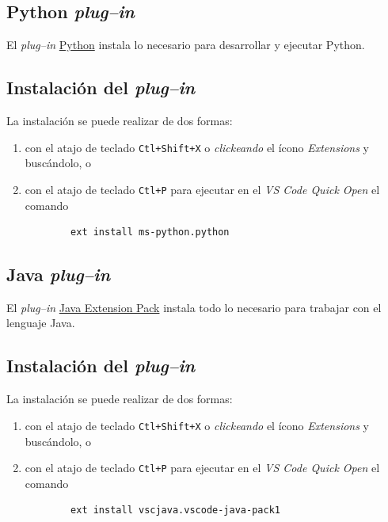 \ifx\python\undefined
\subsection{Python \emph{plug--in}}
\label{pluginPython}

El \emph{plug--in} \href{https://marketplace.visualstudio.com/items?itemName=ms-python.python}{Python} instala lo necesario para desarrollar y ejecutar Python.

\subsection*{Instalación del \emph{plug--in}}
\label{instalacionPython}

La instalación se puede realizar de dos formas:
\begin{enumerate}
	\item con el atajo de teclado \verb|Ctl+Shift+X| o \emph{clickeando} el ícono \emph{Extensions} y buscándolo, o
    \item con el atajo de teclado \verb|Ctl+P| para ejecutar en el \emph{VS Code Quick Open} el comando
    \begin{verbatim}
		ext install ms-python.python
	\end{verbatim}
\end{enumerate}
\fi

\subsection{Java \emph{plug--in}}
\label{pluginJava}

El \emph{plug--in} \href{https://marketplace.visualstudio.com/items?itemName=vscjava.vscode-java-pack}{Java Extension Pack} instala todo lo necesario para trabajar con el lenguaje Java.

\subsection*{Instalación del \emph{plug--in}}
\label{instalacionJava}

La instalación se puede realizar de dos formas:
\begin{enumerate}
	\item con el atajo de teclado \verb|Ctl+Shift+X| o \emph{clickeando} el ícono \emph{Extensions} y buscándolo, o
    \item con el atajo de teclado \verb|Ctl+P| para ejecutar en el \emph{VS Code Quick Open} el comando
    \begin{verbatim}
		ext install vscjava.vscode-java-pack1
	\end{verbatim}
\end{enumerate}


